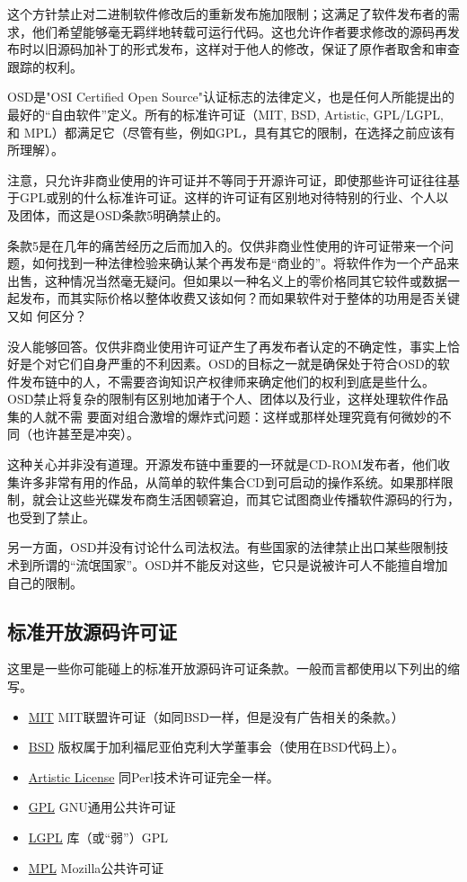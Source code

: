 \documentclass[12pt,oneside]{ctexbook}
\begin{document}
\begin{common-format}
这个方针禁止对二进制软件修改后的重新发布施加限制；这满足了软件发布者的需求，他们希望能够毫无羁绊地转载可运行代码。这也允许作者要求修改的源码再发布时以旧源码加补丁的形式发布，这样对于他人的修改，保证了原作者取舍和审查跟踪的权利。

OSD是"OSI Certified Open Source"认证标志的法律定义，也是任何人所能提出的最好的“自由软件”定义。所有的标准许可证（MIT, BSD, Artistic, GPL/LGPL, 和 MPL）都满足它（尽管有些，例如GPL，具有其它的限制，在选择之前应该有所理解）。

注意，只允许非商业使用的许可证并不等同于开源许可证，即使那些许可证往往基于GPL或别的什么标准许可证。这样的许可证有区别地对待特别的行业、个人以及团体，而这是OSD条款5明确禁止的。

条款5是在几年的痛苦经历之后而加入的。仅供非商业性使用的许可证带来一个问题，如何找到一种法律检验来确认某个再发布是“商业的”。将软件作为一个产品来出售，这种情况当然毫无疑问。但如果以一种名义上的零价格同其它较件或数据一起发布，而其实际价格以整体收费又该如何？而如果软件对于整体的功用是否关键又如
何区分？

没人能够回答。仅供非商业使用许可证产生了再发布者认定的不确定性，事实上恰好是个对它们自身严重的不利因素。OSD的目标之一就是确保处于符合OSD的软件发布链中的人，不需要咨询知识产权律师来确定他们的权利到底是些什么。OSD禁止将复杂的限制有区别地加诸于个人、团体以及行业，这样处理软件作品集的人就不需
要面对组合激增的爆炸式问题：这样或那样处理究竟有何微妙的不同（也许甚至是冲突）。

这种关心并非没有道理。开源发布链中重要的一环就是CD-ROM发布者，他们收集许多非常有用的作品，从简单的软件集合CD到可启动的操作系统。如果那样限制，就会让这些光碟发布商生活困顿窘迫，而其它试图商业传播软件源码的行为，也受到了禁止。

另一方面，OSD并没有讨论什么司法权法。有些国家的法律禁止出口某些限制技术到所谓的“流氓国家”。OSD并不能反对这些，它只是说被许可人不能擅自增加自己的限制。

\subsection{标准开放源码许可证}
这里是一些你可能碰上的标准开放源码许可证条款。一般而言都使用以下列出的缩写。
\begin{itemize}
\item \href{http://www.opensource.org/licenses/mit-license.html}{MIT} MIT联盟许可证（如同BSD一样，但是没有广告相关的条款。）
\item \href{http://www.opensource.org/licenses/bsd-license.html}{BSD} 版权属于加利福尼亚伯克利大学董事会（使用在BSD代码上）。
\item \href{http://www.opensource.org/licenses/artistic-license.html}{Artistic License} 同Perl技术许可证完全一样。
\item \href{http://www.gnu.org/copyleft.html}{GPL} GNU通用公共许可证
\item \href{http://www.gnu.org/copyleft.html}{LGPL} 库（或“弱”）GPL
\item \href{http://www.opensource.org/licenses/MPL-1.1.html}{MPL} Mozilla公共许可证
\end{itemize}


\end{common-format}
\end{document}
